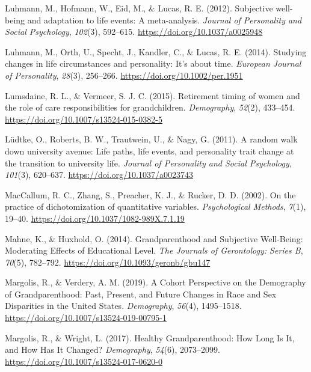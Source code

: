 \documentclass[
  english,
  man, noextraspace]{apa7}
\begin{document}
\leavevmode\hypertarget{ref-luhmannSubjectiveWellbeingAdaptation2012}{}%
Luhmann, M., Hofmann, W., Eid, M., \& Lucas, R. E. (2012). Subjective well-being and adaptation to life events: A meta-analysis. \emph{Journal of Personality and Social Psychology}, \emph{102}(3), 592--615. \url{https://doi.org/10.1037/a0025948}

\leavevmode\hypertarget{ref-luhmannStudyingChangesLife2014}{}%
Luhmann, M., Orth, U., Specht, J., Kandler, C., \& Lucas, R. E. (2014). Studying changes in life circumstances and personality: It's about time. \emph{European Journal of Personality}, \emph{28}(3), 256--266. \url{https://doi.org/10.1002/per.1951}

\leavevmode\hypertarget{ref-lumsdaineRetirementTimingWomen2015}{}%
Lumsdaine, R. L., \& Vermeer, S. J. C. (2015). Retirement timing of women and the role of care responsibilities for grandchildren. \emph{Demography}, \emph{52}(2), 433--454. \url{https://doi.org/10.1007/s13524-015-0382-5}

\leavevmode\hypertarget{ref-ludtkeRandomWalkUniversity2011}{}%
Lüdtke, O., Roberts, B. W., Trautwein, U., \& Nagy, G. (2011). A random walk down university avenue: Life paths, life events, and personality trait change at the transition to university life. \emph{Journal of Personality and Social Psychology}, \emph{101}(3), 620--637. \url{https://doi.org/10.1037/a0023743}

\leavevmode\hypertarget{ref-maccallumPracticeDichotomizationQuantitative2002}{}%
MacCallum, R. C., Zhang, S., Preacher, K. J., \& Rucker, D. D. (2002). On the practice of dichotomization of quantitative variables. \emph{Psychological Methods}, \emph{7}(1), 19--40. \url{https://doi.org/10.1037/1082-989X.7.1.19}

\leavevmode\hypertarget{ref-mahneGrandparenthoodSubjectiveWellBeing2014}{}%
Mahne, K., \& Huxhold, O. (2014). Grandparenthood and Subjective Well-Being: Moderating Effects of Educational Level. \emph{The Journals of Gerontology: Series B}, \emph{70}(5), 782--792. \url{https://doi.org/10.1093/geronb/gbu147}

\leavevmode\hypertarget{ref-margolisCohortPerspectiveDemography2019}{}%
Margolis, R., \& Verdery, A. M. (2019). A Cohort Perspective on the Demography of Grandparenthood: Past, Present, and Future Changes in Race and Sex Disparities in the United States. \emph{Demography}, \emph{56}(4), 1495--1518. \url{https://doi.org/10.1007/s13524-019-00795-1}

\leavevmode\hypertarget{ref-margolisHealthyGrandparenthoodHow2017}{}%
Margolis, R., \& Wright, L. (2017). Healthy Grandparenthood: How Long Is It, and How Has It Changed? \emph{Demography}, \emph{54}(6), 2073--2099. \url{https://doi.org/10.1007/s13524-017-0620-0}
\end{document}
